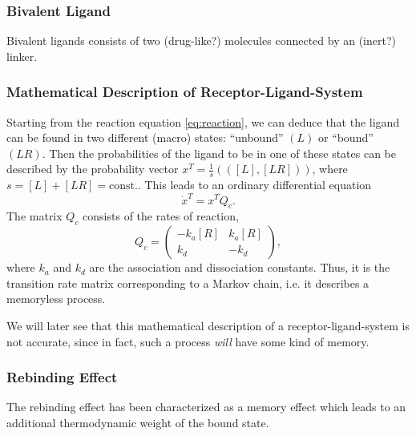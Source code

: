 \subsubsection*{Bivalent Ligand}

Bivalent ligands consists of two (drug-like?) molecules connected by an (inert?) linker.

\subsubsection*{Mathematical Description of Receptor-Ligand-System}

Starting from the reaction equation \eqref{eq:reaction}, we can deduce that the ligand can be found in two different (macro) states: ``unbound'' $(L)$ or ``bound'' $(LR)$. Then the probabilities of the ligand to be in one of these states can be described by the probability vector $x^T = \frac{1}{s}(([L],[LR]))$, where $s = [L] + [LR] = \textrm{const.}$.
This leads to an ordinary differential equation
\begin{equation*}
\dot{x}^T = x^T Q_c.
\end{equation*}
The matrix $Q_c$ consists of the rates of reaction,
\begin{equation*}
Q_c = 
\begin{pmatrix}
-k_a[R] & k_a[R]  \\
k_d      & -k_d
\end{pmatrix},
\end{equation*}
where $k_a$ and $k_d$ are the association and dissociation constants. Thus, it is the transition rate matrix corresponding to a Markov chain, i.e. it describes a memoryless process.

We will later see that this mathematical description of a receptor-ligand-system is not accurate, since in fact, such a process \textit{will} have some kind of memory.


\subsubsection*{Rebinding Effect}

The rebinding effect has been characterized as a memory effect which leads to an additional thermodynamic weight of the bound state.

